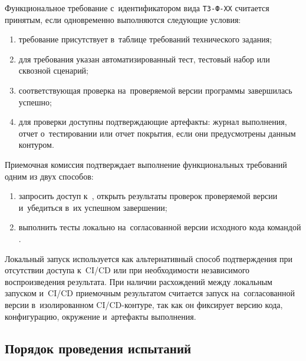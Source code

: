 \documentclass[12pt,a4paper]{extarticle}
\begin{document}
\begin{hseExample}
Функциональное требование с~идентификатором вида \texttt{ТЗ-Ф-XX} считается принятым, если одновременно выполняются следующие условия:

\begin{enumerate}[label=\arabic*), leftmargin=1.25cm]
    \item требование присутствует в~таблице требований технического задания;
    \item для требования указан автоматизированный тест, тестовый набор или сквозной сценарий;
    \item соответствующая проверка на~проверяемой версии программы завершилась успешно;
    \item для проверки доступны подтверждающие артефакты: журнал выполнения, отчет о~тестировании или отчет покрытия, если они предусмотрены данным контуром.
\end{enumerate}

Приемочная комиссия подтверждает выполнение функциональных требований одним из двух способов:

\begin{enumerate}[label=\arabic*), leftmargin=1.25cm]
    \item запросить доступ к~, открыть результаты проверок проверяемой версии и~убедиться в~их успешном завершении;
    \item выполнить тесты локально на~согласованной версии исходного кода командой .
\end{enumerate}

Локальный запуск используется как альтернативный способ подтверждения при отсутствии доступа к~CI/CD или при необходимости независимого воспроизведения результата. При наличии расхождений между локальным запуском и~CI/CD приемочным результатом считается запуск на~согласованной версии в~изолированном CI/CD-контуре, так как он фиксирует версию кода, конфигурацию, окружение и~артефакты выполнения.
\end{hseExample}

\subsection{Порядок проведения испытаний}
\end{document}
